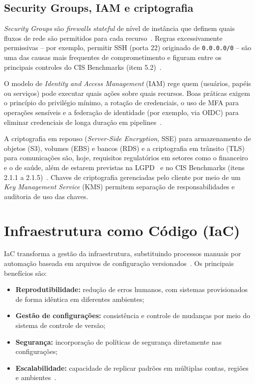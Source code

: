 \subsection{Security Groups, IAM e criptografia}

\textit{Security Groups} são \textit{firewalls} \textit{stateful} de nível de instância que definem quais fluxos de rede são permitidos para cada recurso~. Regras excessivamente permissivas -- por exemplo, permitir SSH (porta 22) originado de \texttt{0.0.0.0/0} -- são uma das causas mais frequentes de comprometimento e figuram entre os principais controles do CIS Benchmarks (item 5.2)~.

O modelo de \textit{Identity and Access Management} (IAM) rege quem (usuários, papéis ou serviços) pode executar quais ações sobre quais recursos. Boas práticas exigem o princípio do privilégio mínimo, a rotação de credenciais, o uso de MFA para operações sensíveis e a federação de identidade (por exemplo, via OIDC) para eliminar credenciais de longa duração em pipelines~.

A criptografia em repouso (\textit{Server-Side Encryption}, SSE) para armazenamento de objetos (S3), volumes (EBS) e bancos (RDS) e a criptografia em trânsito (TLS) para comunicações são, hoje, requisitos regulatórios em setores como o financeiro e o de saúde, além de estarem previstas na LGPD~ e no CIS Benchmarks (itens 2.1.1 a 2.1.5)~. Chaves de criptografia gerenciadas pelo cliente por meio de um \textit{Key Management Service} (KMS) permitem separação de responsabilidades e auditoria de uso das chaves.

\section{Infraestrutura como Código (IaC)}

IaC transforma a gestão da infraestrutura, substituindo processos manuais por automação baseada em arquivos de configuração versionados~. Os principais benefícios são:

\begin{itemize}
    \item \textbf{Reprodutibilidade:} redução de erros humanos, com sistemas provisionados de forma idêntica em diferentes ambientes;
    \item \textbf{Gestão de configurações:} consistência e controle de mudanças por meio do sistema de controle de versão;
    \item \textbf{Segurança:} incorporação de políticas de segurança diretamente nas configurações;
    \item \textbf{Escalabilidade:} capacidade de replicar padrões em múltiplas contas, regiões e ambientes~.
\end{itemize}

